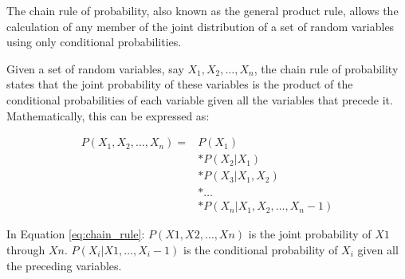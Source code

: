 \documentclass[journal]{IEEEtran}
\begin{document}
The chain rule of probability, also known as the general product rule, allows the calculation of any member of the joint distribution of a set of random variables using only conditional probabilities.

Given a set of random variables, say $X_1, X_2, \ldots, X_n$, the chain rule of probability states that the joint probability of these variables is the product of the conditional probabilities of each variable given all the variables that precede it. Mathematically, this can be expressed as:

\begin{align}
    P(X_1, X_2, \ldots, X_n) = & P(X_1) \nonumber \\
    & * P(X_2 | X_1) \nonumber \\
    & * P(X_3 | X_1, X_2) \nonumber \\
    & * \ldots \nonumber \\
    & * P(X_n | X_1, X_2, \ldots, X_n-1)
    \label{eq:chain_rule}
\end{align}
    
In Equation \ref{eq:chain_rule}: $P(X1, X2, \ldots, Xn)$ is the joint probability of $X1$ through $Xn$. $P(X_i | X1, \ldots, X_i-1)$ is the conditional probability of $X_i$ given all the preceding variables.
\end{document}
